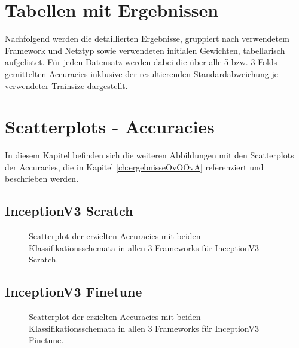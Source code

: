 \makeatletter
\let\savedchap\@makechapterhead
\def\@makechapterhead{\vspace*{-2cm}\savedchap}
\makeatletter
\let\clearpage\relax
\let\cleardoublepage\relax
\chapter{Tabellen mit Ergebnissen}
\label{ch:Anhang_Tabellen}
Nachfolgend werden die detaillierten Ergebnisse, gruppiert nach verwendetem Framework und Netztyp sowie verwendeten initialen Gewichten, tabellarisch aufgelistet.
Für jeden Datensatz werden dabei die über alle 5 bzw. 3 Folds gemittelten Accuracies inklusive der resultierenden Standardabweichung je verwendeter Trainsize dargestellt.
%
\newpage\null\newpage%
\vspace*{-1cm}
\chapter{Scatterplots - Accuracies}
\label{ch:Anhang_ScatterplotsAccuracies}
\vspace*{-0.5cm}
In diesem Kapitel befinden sich die weiteren Abbildungen mit den Scatterplots der Accuracies, die in Kapitel \ref{ch:ergebnisseOvOOvA} referenziert und beschrieben werden.
\section{InceptionV3 Scratch}
\vspace*{-0.8cm}
\begin{figure}[H]
\hspace*{-1.5cm}

\vspace*{-2.5cm}
\caption{Scatterplot der erzielten Accuracies mit beiden Klassifikationsschemata in allen 3 Frameworks für InceptionV3 Scratch.}
\label{fig:ScatterplotIS}
\end{figure}%
\newpage%
\section{InceptionV3 Finetune}
\begin{figure}[H]
\hspace*{-1.5cm}

\caption{Scatterplot der erzielten Accuracies mit beiden Klassifikationsschemata in allen 3 Frameworks für InceptionV3 Finetune.}
\label{fig:ScatterplotIF}
\end{figure}%
\newpage%
